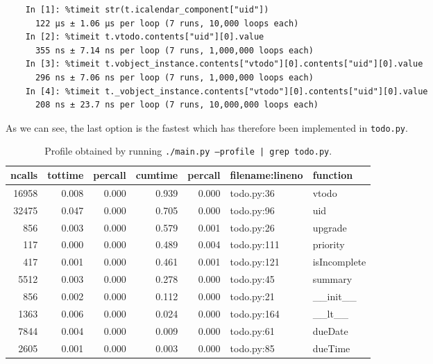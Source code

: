 \documentclass{prettytex/ox/mmsc-special-topic}
\begin{document}
  \begin{verbatim}
    In [1]: %timeit str(t.icalendar_component["uid"])
      122 µs ± 1.06 µs per loop (7 runs, 10,000 loops each)
    In [2]: %timeit t.vtodo.contents["uid"][0].value
      355 ns ± 7.14 ns per loop (7 runs, 1,000,000 loops each)
    In [3]: %timeit t.vobject_instance.contents["vtodo"][0].contents["uid"][0].value
      296 ns ± 7.06 ns per loop (7 runs, 1,000,000 loops each)
    In [4]: %timeit t._vobject_instance.contents["vtodo"][0].contents["uid"][0].value
      208 ns ± 23.7 ns per loop (7 runs, 10,000,000 loops each)
  \end{verbatim}

  As we can see, the last option is the fastest which has therefore been implemented in \texttt{todo.py}.

  \begin{table}[H]
    \centering
    \caption{Profile obtained by running \texttt{./main.py --profile | grep todo.py}.}
    \begin{tabular}{rrrrrll}
      \hline
      ncalls & tottime & percall & cumtime & percall & filename:lineno & function     \\
      \hline
      16958  & 0.008   & 0.000   & 0.939   & 0.000   & todo.py:36      & vtodo        \\
      32475  & 0.047   & 0.000   & 0.705   & 0.000   & todo.py:96      & uid          \\
      856    & 0.003   & 0.000   & 0.579   & 0.001   & todo.py:26      & upgrade      \\
      117    & 0.000   & 0.000   & 0.489   & 0.004   & todo.py:111     & priority     \\
      417    & 0.001   & 0.000   & 0.461   & 0.001   & todo.py:121     & isIncomplete \\
      5512   & 0.003   & 0.000   & 0.278   & 0.000   & todo.py:45      & summary      \\
      856    & 0.002   & 0.000   & 0.112   & 0.000   & todo.py:21      & \_\_init\_\_ \\
      1363   & 0.006   & 0.000   & 0.024   & 0.000   & todo.py:164     & \_\_lt\_\_   \\
      7844   & 0.004   & 0.000   & 0.009   & 0.000   & todo.py:61      & dueDate      \\
      2605   & 0.001   & 0.000   & 0.003   & 0.000   & todo.py:85      & dueTime      \\
    \end{tabular}
    \label{table:paint-profile}
  \end{table}

  
\end{document}
